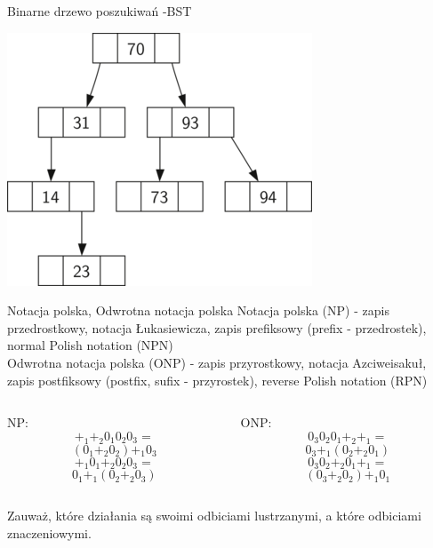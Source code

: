 \begin{frame}{Binarne drzewo poszukiwań -BST}
    \begin{center}
        \includegraphics[height=0.8\textheight]{introduction/graphics/bst.png}
    \end{center}
\end{frame}

\begin{frame}{Notacja polska, Odwrotna notacja polska}
    Notacja polska (NP) - zapis przedrostkowy, notacja Łukasiewicza, zapis prefiksowy (prefix - przedrostek), normal Polish notation (NPN) \\
    Odwrotna notacja polska (ONP) - zapis przyrostkowy, notacja Azciweisakuł, zapis postfiksowy (postfix, sufix - przyrostek), reverse Polish notation (RPN) \\
    \begin{columns}
        \begin{column}{0.5\textwidth}
            NP:
            \[ +_1 +_2 0_1 0_2 0_3 = \]
            \[ ( 0_1 +_2 0_2 ) +_1 0_3 \]
            \[ +_1 0_1 +_2 0_2 0_3 = \]
            \[ 0_1 +_1 ( 0_2 +_2 0_3 ) \]
        \end{column}
        \begin{column}{0.5\textwidth}
            ONP:
            \[ 0_3 0_2 0_1 +_2 +_1 = \]
            \[ 0_3 +_1 ( 0_2 +_2 0_1 ) \]
            \[ 0_3 0_2 +_2 0_1 +_1 = \]
            \[ ( 0_3 +_2 0_2 ) +_1 0_1 \]
        \end{column}
    \end{columns}
    Zauważ, które działania są swoimi odbiciami lustrzanymi, a które odbiciami znaczeniowymi.
\end{frame}

